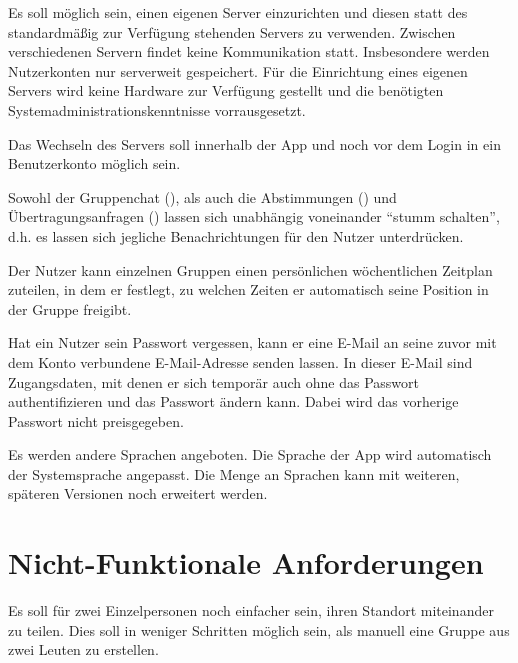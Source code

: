 \documentclass[parskip=full,11pt]{scrartcl}
\begin{document}
%
Es soll möglich sein, einen eigenen Server einzurichten und diesen statt des
standardmäßig zur Verfügung stehenden Servers zu verwenden.
Zwischen verschiedenen Servern findet keine Kommunikation statt.
Insbesondere werden Nutzerkonten nur serverweit gespeichert.
Für die Einrichtung eines eigenen Servers wird keine Hardware zur Verfügung
gestellt und die benötigten Systemadministrationskenntnisse vorrausgesetzt.

%
Das Wechseln des Servers soll innerhalb der App und noch vor dem Login in ein
Benutzerkonto möglich sein.

%
Sowohl der Gruppenchat (), als auch die
Abstimmungen () und Übertragungsanfragen
() lassen sich unabhängig voneinander
\enquote{stumm schalten}, d.h. es lassen sich jegliche Benachrichtungen für den
Nutzer unterdrücken.

%
Der Nutzer kann einzelnen Gruppen einen persönlichen wöchentlichen Zeitplan
zuteilen, in dem er festlegt, zu welchen Zeiten er automatisch seine Position
in der Gruppe freigibt.

%
Hat ein Nutzer sein Passwort vergessen, kann er eine E-Mail an seine zuvor
mit dem Konto verbundene E-Mail-Adresse senden lassen.
In dieser E-Mail sind Zugangsdaten, mit denen er sich temporär auch ohne das
Passwort authentifizieren und das Passwort ändern kann.
Dabei wird das vorherige Passwort nicht preisgegeben.

Es werden andere Sprachen angeboten.
Die Sprache der App wird automatisch der Systemsprache angepasst.
Die Menge an Sprachen kann mit weiteren, späteren Versionen noch erweitert werden.

\pagebreak
\section{Nicht-Funktionale Anforderungen}

%
Es soll für zwei Einzelpersonen noch einfacher sein, ihren Standort miteinander
zu teilen. Dies soll in weniger Schritten möglich sein, als manuell eine
Gruppe aus zwei Leuten zu erstellen.
\end{document}
